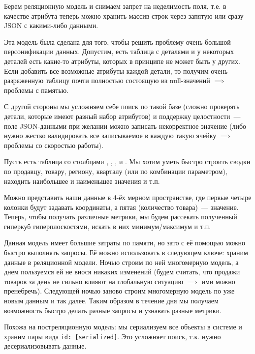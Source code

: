 
Берем реляционную модель и снимаем запрет на неделимость поля, т.е. в качестве
атрибута теперь можно хранить массив строк через запятую или сразу JSON с
какими-либо данными.

Эта модель была сделана для того, чтобы решить проблему очень большой
персонификации данных. Допустим, есть таблица с деталями и у некоторых
деталей есть какие-то атрибуты, которых в принципе не может быть у других. Если
добавить все возможные атрибуты каждой детали, то получим очень разряженную
таблицу почти полностью состоящую из null-значений \(\implies\) проблемы с
памятью.

С другой стороны мы усложняем себе поиск по такой базе (сложно проверять детали,
которые имеют разный набор атрибутов) и поддержку целостности~---  поле
JSON-данными при желании можно записать некорректное значение (либо нужно жестко
валидировать все записываемое в каждую такую ячейку \(\implies\) проблемы со
скоростью работы).


Пусть есть таблица со столбцами , , ,
 и . Мы хотим уметь быстро строить сводки по
продавцу, товару, региону, кварталу (или по комбинации параметром), находить
наибольшее и наименьшее значения и т.п.

Можно представить наши данные в 4-ёх мерном пространстве, где первые четыре
колонки будут задавать координаты, а пятая (количество товара)~--- значение.
Теперь, чтобы получать различные метрики, мы будем рассекать полученный гиперкуб
гиперплоскостями, искать в них минимум/максимум и т.п.

Данная модель имеет большие затраты по памяти, но зато с её помощью можно быстро
выполнять запросы. Её можно использовать в следующем ключе: храним данные в
реляционной модели. Ночью строим по ней многомерную модель, а днем пользуемся ей
не внося никаких изменений (будем считать, что продажи товаров за день не сильно
влияют на глобальную ситуацию \(\implies\) ими можно пренебречь). Следующей
ночью заново строим многомерную модель по уже новым данным и так далее. Таким
образом в течение дня мы получаем возможность быстро делать разные запросы и
узнавать разные метрики.


Похожа на постреляционную модель: мы сериализуем все объекты в системе и храним
пары вида \texttt{id: [serialized]}. Это усложняет поиск, т.к. нужно
десериализовывать данные.
